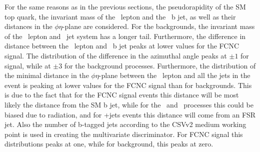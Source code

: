    For the same reasons as in the previous sections, the pseudorapidity of the SM top quark,  the invariant mass of the \PW\ lepton and the \SM\ b jet, as well as their distances in the $\phi\eta$-plane are considered. For the backgrounds, the invariant mass of the \PW\ lepton and \SM\ jet system has a longer tail. Furthermore, the difference in distance  between the \PW\ lepton and \SM\ b jet peaks at lower values for the FCNC signal. The distribution of the difference in the azimuthal angle peaks at $\pm1$ for signal, while at $\pm 3$ for the background processes. Furthermore, the distribution of the minimal distance in the $\phi\eta$-plane between the \PW\ lepton and all the jets in the event is peaking at lower values for the FCNC signal than for backgrounds. This is due to the fact that for the FCNC signal events this distance will be most likely the distance from the SM b  jet, while for the \ttZ\ and \tZq\ processes this could be biased due to radiation, and for \WZ+jets events this distance will come from an FSR jet.  Also the number of b-tagged jets according to the CSVv2 medium working point is used in creating the multivariate discriminator. For FCNC signal this distributions peaks at one, while for background, this peaks at zero.
   
